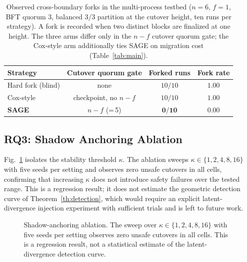 \documentclass[journal]{IEEEtran}
\theoremstyle{remark}
\begin{document}
\begin{table}[t]
\centering
\caption{Observed cross-boundary forks in the multi-process testbed ($n{=}6$, $f{=}1$, BFT
quorum $3$, balanced $3/3$ partition at the cutover height, ten runs per strategy). A fork is
recorded when two distinct blocks are finalized at one height. The three arms differ only in the
$n{-}f$ cutover quorum gate; the Cox-style arm additionally ties SAGE on migration cost
(Table~\ref{tab:main}).}
\label{tab:testbed}
\setlength{\tabcolsep}{6pt}
\renewcommand{\arraystretch}{1.2}
\footnotesize
\begin{tabular}{lccc}
\toprule
Strategy & Cutover quorum gate & Forked runs & Fork rate \\
\midrule
Hard fork (blind) & none           & $10/10$         & $1.00$ \\
Cox-style         & checkpoint, no $n{-}f$ & $10/10$ & $1.00$ \\
\textbf{SAGE}     & $n{-}f$ (=\,5)  & $\mathbf{0/10}$ & $\mathbf{0.00}$ \\
\bottomrule
\end{tabular}
\end{table}

\subsection{RQ3: Shadow Anchoring Ablation}
Fig.~\ref{fig:ablation} isolates the stability threshold $\kappa$. The ablation sweeps
$\kappa\in\{1,2,4,8,16\}$ with five seeds per setting and observes zero unsafe cutovers in all
cells, confirming that increasing $\kappa$ does not introduce safety failures over the tested
range. This is a regression result; it does not estimate the geometric detection curve of
Theorem~\ref{th:detection}, which would require an explicit latent-divergence injection
experiment with sufficient trials and is left to future work.

\begin{figure}[t]
\centering
{}
\caption{Shadow-anchoring ablation. The sweep over
$\kappa\in\{1,2,4,8,16\}$ with five seeds per setting observes zero unsafe cutovers in all
cells. This is a regression result, not a statistical estimate of the
latent-divergence detection curve.}
\label{fig:ablation}
\end{figure}
\end{document}
